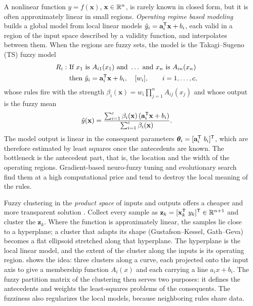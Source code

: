 A nonlinear function $y=f(\mathbf{x})$, $\mathbf{x}\in\mathbb{R}^n$, is rarely known in closed form, but it is often approximately linear in small regions. \emph{Operating regime based modeling} builds a global model from local linear models $\hat y_i=\mathbf{a}_i^{\mathsf{T}}\mathbf{x}+b_i$, each valid in a region of the input space described by a validity function, and interpolates between them. When the regions are fuzzy sets, the model is the Takagi--Sugeno (TS) fuzzy model \cite{takagi:1985}
\begin{equation}
  \begin{aligned}
  R_i:\ &\text{If } x_1 \text{ is } A_{i1}(x_1) \text{ and } \dots \text{ and } x_n \text{ is } A_{in}(x_n)\\
        &\text{then } \hat y_i = \mathbf{a}_i^{\mathsf{T}}\mathbf{x}+b_i,\quad [w_i],\qquad i=1,\dots,c,
  \end{aligned}
  \label{eq:models:tsrule}
\end{equation}
whose rules fire with the strength $\beta_i(\mathbf{x})=w_i\prod_{j=1}^{n}A_{ij}(x_j)$ and whose output is the fuzzy mean
\begin{equation}
  \hat y(\mathbf{x})=\frac{\sum_{i=1}^{c}\beta_i(\mathbf{x})\,(\mathbf{a}_i^{\mathsf{T}}\mathbf{x}+b_i)}{\sum_{i=1}^{c}\beta_i(\mathbf{x})}.
  \label{eq:models:tsout}
\end{equation}
The model output is linear in the consequent parameters $\boldsymbol\theta_i=[\mathbf{a}_i\T\ b_i]\T$, which are therefore estimated by least squares once the antecedents are known. The bottleneck is the antecedent part, that is, the location and the width of the operating regions. Gradient-based neuro-fuzzy tuning and evolutionary search find them at a high computational price and tend to destroy the local meaning of the rules.

Fuzzy clustering in the \emph{product space} of inputs and outputs offers a cheaper and more transparent solution \cite{babuska:1997:productspace,babuska:1998:book}. Collect every sample as $\mathbf{z}_k=[\mathbf{x}_k\T\ y_k]\T\in\R^{n+1}$ and cluster the $\mathbf{z}_k$. Where the function is approximately linear, the samples lie close to a hyperplane; a cluster that adapts its shape (Gustafson--Kessel, Gath--Geva) becomes a flat ellipsoid stretched along that hyperplane. The hyperplane is the local linear model, and the extent of the cluster along the inputs is its operating region.  shows the idea: three clusters along a curve, each projected onto the input axis to give a membership function $A_i(x)$ and each carrying a line $a_ix+b_i$. The fuzzy partition matrix of the clustering then serves two purposes: it defines the antecedents and weights the least-squares problems of the consequents. The fuzziness also regularizes the local models, because neighboring rules share data.

